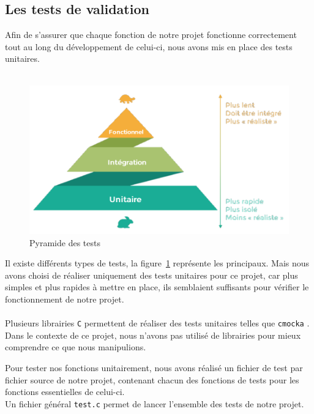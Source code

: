 \subsection*{Les tests de validation}
\label{sec:tests}
Afin de s'assurer que chaque fonction de notre projet fonctionne correctement tout au long du développement de celui-ci, nous avons mis en place des tests unitaires.\\ \\
\begin{minipage}{0.4\textwidth}
    \begin{figure}[H]
        \centering
        \includegraphics[width=\textwidth]{img/tests.png}
        \caption{Pyramide des tests~\cite{openclassrooms_pyramide_tests}}
        \label{fig:test_pyramid}
    \end{figure}
\end{minipage}\hfill
\begin{minipage}{0.55\textwidth}
Il existe différents types de tests, la figure~\ref{fig:test_pyramid} représente les principaux.
Mais nous avons choisi de réaliser uniquement des tests unitaires pour ce projet, car plus simples et plus rapides à mettre en place, ils semblaient suffisants pour vérifier le fonctionnement de notre projet.\\ \\
Plusieurs librairies \texttt{C} permettent de réaliser des tests unitaires telles que \texttt{cmocka} \cite{cmocka2025}.
Dans le contexte de ce projet, nous n'avons pas utilisé de librairies pour mieux comprendre ce que nous manipulions.\\
\end{minipage}
Pour tester nos fonctions unitairement, nous avons réalisé un fichier de test par fichier source de notre projet, contenant chacun des fonctions de tests pour les fonctions essentielles de celui-ci.\\
Un fichier général \texttt{test.c} permet de lancer l'ensemble des tests de notre projet.
